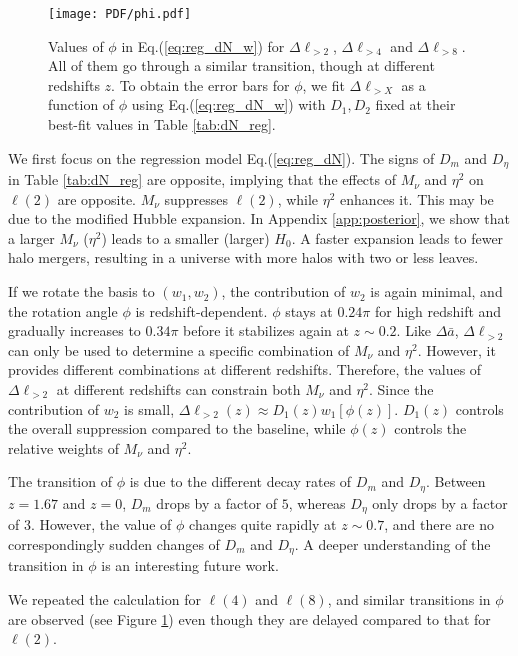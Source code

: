 \begin{figure}[!h]
		\begin{center}%
		\texttt{[image: PDF/phi.pdf]}
		\caption{\label{fig:phi} Values of $\phi$ in Eq.(\ref{eq:reg_dN_w}) for $\Delta \ell_{>2}$,  $\Delta \ell_{>4}$ and $\Delta \ell_{>8}$. All of them go through a similar transition, though at different redshifts $z$. 
		To obtain the error bars for $\phi$, we fit $\Delta \ell_{>X}$ as a function of $\phi$ using Eq.(\ref{eq:reg_dN_w}) with $D_1, D_2$ fixed at their best-fit values in Table \ref{tab:dN_reg}.}
		\end{center}
\end{figure}

We first focus on the regression model Eq.(\ref{eq:reg_dN}). The signs of $D_m$ and $D_\eta$ in Table \ref{tab:dN_reg} are opposite, implying that the effects of $M_\nu$ and $\eta^2$ on $\ell(2)$ are opposite. 
$M_\nu$ suppresses $\ell(2)$, while $\eta^2$ enhances it. 
This may be due to the modified Hubble expansion. 
In Appendix \ref{app:posterior}, we show that a larger $M_\nu$ ($\eta^2$) leads to a smaller (larger) $H_0$.
A faster expansion leads to fewer halo mergers,
resulting in a universe with more halos with two or less leaves.

If we rotate the basis to $(w_1, w_2)$, the contribution of $w_2$ is again minimal, and the rotation angle $\phi$ is redshift-dependent. $\phi$ stays at $0.24\pi$ for high redshift and gradually increases to $0.34\pi$ before it stabilizes again at $z\sim0.2$. 
Like $\Delta \bar a$, $\Delta \ell_{>2}$ can only be used to determine a specific combination of $M_\nu$ and $\eta^2$. However, it provides different combinations at different redshifts. Therefore, the values of $\Delta \ell_{>2}$ at different redshifts can constrain both $M_\nu$ and $\eta^2$.
Since the contribution of $w_2$ is small, $\Delta \ell_{>2}(z)\approx D_1(z) w_1[\phi(z)]$. $D_1(z)$ controls the overall suppression compared to the baseline, while $\phi(z)$ controls the relative weights of $M_\nu$ and $\eta^2$.

The transition of $\phi$ is due to the different decay rates of $D_m$ and $D_\eta$. 
Between $z=1.67$ and $z=0$, $D_m$ drops by a factor of $5$, whereas $D_\eta$ only drops by a factor of $3$. 
However, the value of $\phi$ changes quite rapidly at $z\sim0.7$, and there are no correspondingly sudden changes of $D_m$ and $D_\eta$. A deeper understanding of the transition in $\phi$ is an interesting future work. 

We repeated the calculation for $\ell(4)$ and $\ell(8)$, and similar transitions in $\phi$ are observed (see Figure \ref{fig:phi}) even though they are delayed compared to that for $\ell(2)$.


